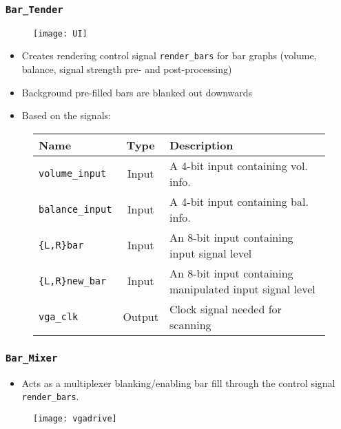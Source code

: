 \begin{frame}
  \frametitle{\texttt{Bar\_Tender}}
    \begin{figure}
      \centering
      \texttt{[image: UI]}
    \end{figure}
    \begin{itemize}
      \item Creates rendering control signal \texttt{render\_bars} for bar graphs (volume, balance, signal strength pre- and post-processing)
      \item Background pre-filled bars are blanked out downwards
      \item Based on the signals:
    \end{itemize}
    \begin{figure}
      \centering
      \small{
        \begin{tabular}{|l|c|p{6.2cm}|}
          \hline
          Name & Type & Description \\
          \hline
          \texttt{volume\_input} & Input & A 4-bit input containing vol. info.\\
          \hline
          \texttt{balance\_input} & Input & A 4-bit input containing bal. info.\\
          \hline
          \texttt{\{L,R\}bar} & Input & An 8-bit input containing input signal level\\
          \hline
          \texttt{\{L,R\}new\_bar} & Input & An 8-bit input containing manipulated input signal level\\
          \hline
          \texttt{vga\_clk} & Output & Clock signal needed for scanning\\
          \hline
        \end{tabular}
      }
    \end{figure}
\end{frame}

\begin{frame}
  \frametitle{\texttt{Bar\_Mixer}}
    \begin{itemize}
      \item Acts as a multiplexer blanking/enabling bar fill through the control signal \texttt{render\_bars}.
    \end{itemize}
    \begin{figure}
      \centering
      \texttt{[image: vgadrive]}
    \end{figure}
\end{frame}
